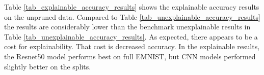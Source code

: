 \begin{table}[H]
    \renewcommand{\arraystretch}{1.3}
    \centering
    \caption{Benchmark unexplainable accuracy results on the full and various splits of the balanced EMNIST data sets with differing ML models.}
    \label{tab_unexplainable_accuracy_results}
\end{table}

Table \ref{tab_explainable_accuracy_results} shows the explainable accuracy
results on the unpruned data. Compared to Table
\ref{tab_unexplainable_accuracy_results} the results are considerably lower than
the benchmark unexplainable results in Table
\ref{tab_unexplainable_accuracy_results}.  As expected, there appears to be a
cost for explainability.  That cost is decreased accuracy. In the explainable
results, the Resnet50 model performs best on full EMNIST, but CNN models
performed slightly better on the splits.

